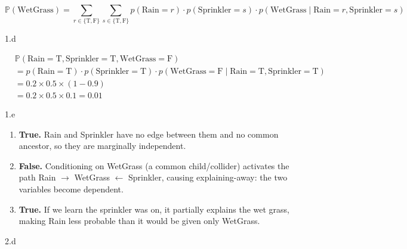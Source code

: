 \begin{answer}
  \[
    \mathbb{P}(\text{WetGrass}) = \sum_{r \in \{\text{T},\text{F}\}} \sum_{s \in \{\text{T},\text{F}\}} p(\text{Rain}=r) \cdot p(\text{Sprinkler}=s) \cdot p(\text{WetGrass} \mid \text{Rain}=r, \text{Sprinkler}=s)
  \]
\end{answer}

\LARGE
1.d
\normalsize

\begin{answer}
  \begin{align*}
    &\mathbb{P}(\text{Rain}=\text{T}, \text{Sprinkler}=\text{T}, \text{WetGrass}=\text{F}) \\
    &= p(\text{Rain}=\text{T}) \cdot p(\text{Sprinkler}=\text{T}) \cdot p(\text{WetGrass}=\text{F} \mid \text{Rain}=\text{T}, \text{Sprinkler}=\text{T}) \\
    &= 0.2 \times 0.5 \times (1 - 0.9) \\
    &= 0.2 \times 0.5 \times 0.1 = \mathbf{0.01}
  \end{align*}
\end{answer}

\LARGE
1.e
\normalsize

\begin{answer}
  \begin{enumerate}[label=(\alph*)]
    \item \textbf{True.} Rain and Sprinkler have no edge between them and no common ancestor, so they are marginally independent.
    \item \textbf{False.} Conditioning on WetGrass (a common child/collider) activates the path Rain $\rightarrow$ WetGrass $\leftarrow$ Sprinkler, causing explaining-away: the two variables become dependent.
    \item \textbf{True.} If we learn the sprinkler was on, it partially explains the wet grass, making Rain less probable than it would be given only WetGrass.
  \end{enumerate}
\end{answer}
\clearpage

\LARGE
2.d
\normalsize


